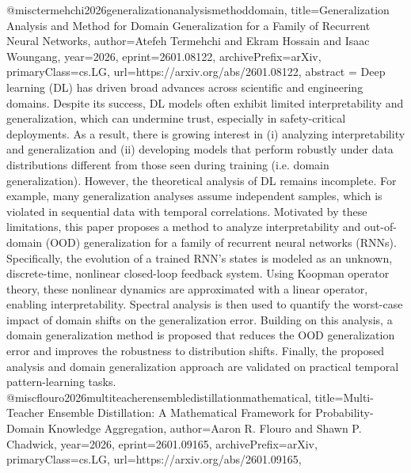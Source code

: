 {}@misc{termehchi2026generalizationanalysismethoddomain,
      title={Generalization Analysis and Method for Domain Generalization for a Family of Recurrent Neural Networks}, 
      author={Atefeh Termehchi and Ekram Hossain and Isaac Woungang},
      year={2026},
      eprint={2601.08122},
      archivePrefix={arXiv},
      primaryClass={cs.LG},
      url={https://arxiv.org/abs/2601.08122},
      abstract = {Deep learning (DL) has driven broad advances across scientific and engineering domains. Despite its success, DL models often exhibit limited interpretability and generalization, which can undermine trust, especially in safety-critical deployments. As a result, there is growing interest in (i) analyzing interpretability and generalization and (ii) developing models that perform robustly under data distributions different from those seen during training (i.e. domain generalization). However, the theoretical analysis of DL remains incomplete. For example, many generalization analyses assume independent samples, which is violated in sequential data with temporal correlations. Motivated by these limitations, this paper proposes a method to analyze interpretability and out-of-domain (OOD) generalization for a family of recurrent neural networks (RNNs). Specifically, the evolution of a trained RNN's states is modeled as an unknown, discrete-time, nonlinear closed-loop feedback system. Using Koopman operator theory, these nonlinear dynamics are approximated with a linear operator, enabling interpretability. Spectral analysis is then used to quantify the worst-case impact of domain shifts on the generalization error. Building on this analysis, a domain generalization method is proposed that reduces the OOD generalization error and improves the robustness to distribution shifts. Finally, the proposed analysis and domain generalization approach are validated on practical temporal pattern-learning tasks.}
}@misc{flouro2026multiteacherensembledistillationmathematical,
      title={Multi-Teacher Ensemble Distillation: A Mathematical Framework for Probability-Domain Knowledge Aggregation}, 
      author={Aaron R. Flouro and Shawn P. Chadwick},
      year={2026},
      eprint={2601.09165},
      archivePrefix={arXiv},
      primaryClass={cs.LG},
      url={https://arxiv.org/abs/2601.09165},
}
